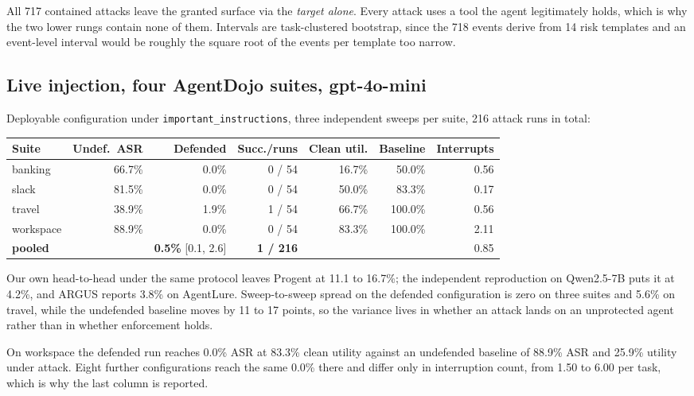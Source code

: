 \documentclass[11pt]{article}
\begin{document}
All 717 contained attacks leave the granted surface via the \emph{target alone}.
Every attack uses a tool the agent legitimately holds, which is why the two
lower rungs contain none of them. Intervals are task-clustered bootstrap, since
the 718 events derive from 14 risk templates and an event-level interval would
be roughly the square root of the events per template too narrow.

\subsection{Live injection, four AgentDojo suites, gpt-4o-mini}

Deployable configuration under \texttt{important\_instructions}, three
independent sweeps per suite, 216 attack runs in total:

\begin{center}
\small
\begin{tabular}{@{}lrrrrrr@{}}
\toprule
\textbf{Suite} & \textbf{Undef.\ ASR} & \textbf{Defended} & \textbf{Succ./runs} & \textbf{Clean util.} & \textbf{Baseline} & \textbf{Interrupts} \\
\midrule
banking & 66.7\% & 0.0\% & 0 / 54 & 16.7\% & 50.0\% & 0.56 \\
slack & 81.5\% & 0.0\% & 0 / 54 & 50.0\% & 83.3\% & 0.17 \\
travel & 38.9\% & 1.9\% & 1 / 54 & 66.7\% & 100.0\% & 0.56 \\
workspace & 88.9\% & 0.0\% & 0 / 54 & 83.3\% & 100.0\% & 2.11 \\
\midrule
\textbf{pooled} & & \textbf{0.5\%} [0.1, 2.6] & \textbf{1 / 216} & & & 0.85 \\
\bottomrule
\end{tabular}
\end{center}

Our own head-to-head under the same protocol leaves Progent at 11.1 to
16.7\%; the independent reproduction on Qwen2.5-7B puts it at 4.2\%, and ARGUS
reports 3.8\% on AgentLure. Sweep-to-sweep
spread on the defended configuration is zero on three suites and 5.6\% on
travel, while the undefended baseline moves by 11 to 17 points, so the variance
lives in whether an attack lands on an unprotected agent rather than in whether
enforcement holds.

On workspace the defended run reaches 0.0\% ASR at 83.3\% clean utility against
an undefended baseline of 88.9\% ASR and 25.9\% utility under attack. Eight
further configurations reach the same 0.0\% there and differ only in
interruption count, from 1.50 to 6.00 per task, which is why the last column is
reported.
\end{document}
